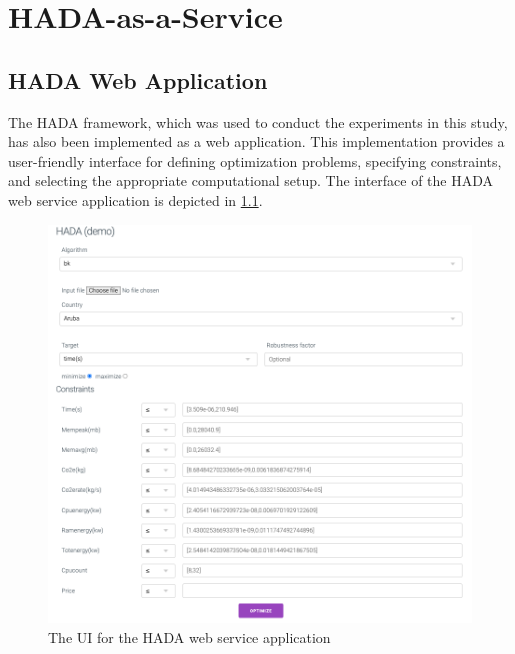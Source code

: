 \documentclass[a4paper,singleside,12pt]{report} %
\begin{document}
\chapter{HADA-as-a-Service}

\section{HADA Web Application}

The HADA framework, which was used to conduct the experiments in this study, has also been implemented as a web application. This implementation provides a user-friendly interface 
for defining optimization problems, specifying constraints, and selecting the appropriate computational setup. The interface of the HADA web service application is depicted in 
\ref{fig:hada_ui}.

\begin{figure}[h!]
    \centering
    \includegraphics[width=\textwidth]{imgs/HADA-main-ui.png}
    \caption{The UI for the HADA web service application}
    \label{fig:hada_ui}
\end{figure}
\end{document}

